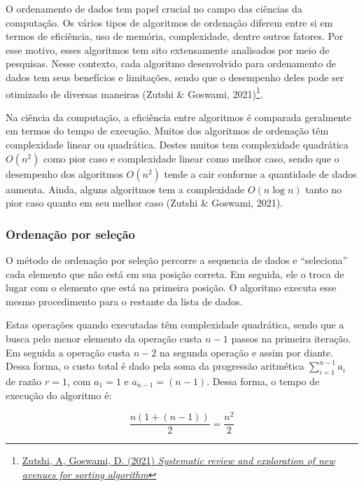 \documentclass[
]{article}
\begin{document}
O ordenamento de dados tem papel crucial no campo das ciências da
computação. Os vários tipos de algoritmos de ordenação diferem entre si
em termos de eficiência, uso de memória, complexidade, dentre outros
fatores. Por esse motivo, esses algoritmos tem sito extensamente
analisados por meio de pesquisas. Nesse contexto, cada algoritmo
desenvolvido para ordenamento de dados tem seus benefícios e limitações,
sendo que o desempenho deles pode ser otimizado de diversas maneiras
(Zutshi \& Goswami, 2021)\footnote{\href{https://www.sciencedirect.com/science/article/pii/S2667096821000355}{Zutshi,
  A, Goswami, D. (2021) \emph{Systematic review and exploration of new
  avenues for sorting algorithm}}}.

Na ciência da computação, a eficiência entre algoritmos é comparada
geralmente em termos do tempo de execução. Muitos dos algoritmos de
ordenação têm complexidade linear ou quadrática. Destes muitos tem
complexidade quadrática \(O(n^2)\) como pior caso e complexidade linear
como melhor caso, sendo que o desempenho dos algoritmos \(O(n^2)\) tende
a cair conforme a quantidade de dados aumenta. Ainda, alguns algoritmos
tem a complexidade \(O(n \log n)\) tanto no pior caso quanto em seu
melhor caso (Zutshi \& Goswami, 2021).

\hypertarget{ordenauxe7uxe3o-por-seleuxe7uxe3o}{%
\subsubsection{Ordenação por
seleção}\label{ordenauxe7uxe3o-por-seleuxe7uxe3o}}

O método de ordenação por seleção percorre a sequencia de dados e
``seleciona'' cada elemento que não está em sua posição correta. Em
seguida, ele o troca de lugar com o elemento que está na primeira
posição. O algoritmo executa esse mesmo procedimento para o restante da
lista de dados.

Estas operações quando executadas têm complexidade quadrática, sendo que
a busca pelo menor elemento da operação custa \(n - 1\) passos na
primeira iteração. Em seguida a operação custa \(n - 2\) na segunda
operação e assim por diante. Dessa forma, o custo total é dado pela soma
da progressão aritmética \(\sum\limits_{i = 1}^{n-1} a_i\) de razão
\(r = 1\), com \(a_1 = 1\) e \(a_{n-1} = (n-1)\). Dessa forma, o tempo
de execução do algoritmo é:

\begin{equation}
  \frac{n(1+(n-1))}{2} = \frac{n^2}{2}
\end{equation}
\end{document}
